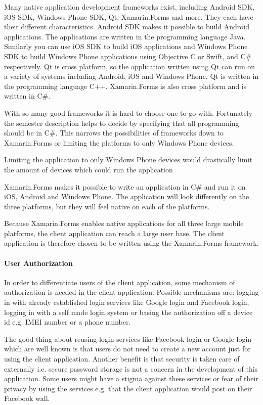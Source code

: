 Many native application development frameworks exist, including Android SDK, iOS SDK, Windows Phone SDK, Qt, Xamarin.Forms and more. They each have their different characteristics. Android SDK makes it possible to build Android applications. The applications are written in the programming language Java. Similarly you can use iOS SDK to build iOS applications and Windows Phone SDK to build Windows Phone applications using Objective C or Swift, and C\# respectively. Qt is cross platform, so the application written using Qt can run on a variety of systems including Android, iOS and Windows Phone. Qt is written in the programming language C++. Xamarin.Forms is also cross platform and is written in C\#.

With so many good frameworks it is hard to choose one to go with. Fortunately the semester description helps to decide by specifying that all programming should be in C\#. This narrows the possibilities of frameworks down to Xamarin.Forms or limiting the platforms to only Windows Phone devices. 

Limiting the application to only Windows Phone devices would drastically limit the amount of devices which could run the application

Xamarin.Forms makes it possible to write an application in C\# and run it on iOS, Android and Windows Phone. The application will look differently on the three platforms, but they will feel native on each of the platforms.

Because Xamarin.Forms enables native applications for all three large mobile platforms, the client application can reach a large user base. The client application is therefore chosen to be written using the Xamarin.Forms framework.

\paragraph{User Authorization}
\label{par:user_authorization}

In order to differentiate users of the client application, some mechanism of authorization is needed in the client application. Possible mechanisms are: logging in with already established login services like Google login and Facebook login, logging in with a self made login system or basing the authorization off a device id e.g. IMEI number or a phone number.

The good thing about reusing login services like Facebook login or Google login which are well known is that users do not need to create a new account just for using the client application. Another benefit is that security is taken care of externally i.e. secure password storage is not a concern in the development of this application. Some users might have a stigma against these services or fear of their privacy by using the services e.g. that the client application would post on their Facebook wall.

